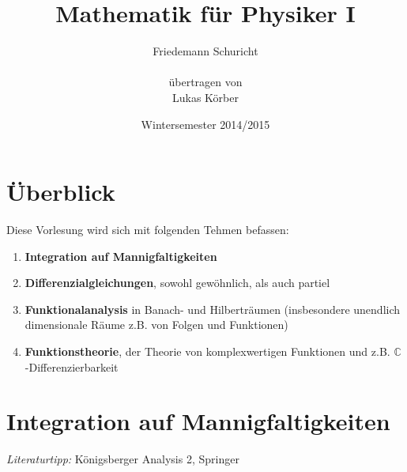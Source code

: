 \documentclass[a4paper,12pt,portrait]{book}
\title{Mathematik f\"ur Physiker I}
\author{Friedemann Schuricht\\ \\ \"ubertragen von\\Lukas K\"orber}
\date{Wintersemester 2014/2015}
\theoremstyle{theoremstyle}
\begin{document}
\maketitle
\tableofcontents
\pagestyle{fancy}
\renewcommand{\thechapter}{\Roman{chapter}} 
\renewcommand*\thesection{\arabic{section}}
\renewcommand\theequation{\maybe{\arabic{chapter}}\arabic{section}.\arabic{equation}}
\DeclareRobustCommand\maybe[1]{\ifnum#1=\value{chapter}\relax\else\uppercase\expandafter{\romannumeral#1}.\fi}
\setcounter{chapter}{7}

\chapter*{Überblick}
Diese Vorlesung wird sich mit folgenden Tehmen befassen:
    \begin{enumerate}
    \item \textbf{Integration auf Mannigfaltigkeiten}
    \item \textbf{Differenzialgleichungen}, sowohl gewöhnlich, als auch partiel
    \item \textbf{Funktionalanalysis} in Banach- und Hilberträumen (insbesondere
    unendlich dimensionale Räume z.B. von Folgen und Funktionen)
    \item \textbf{Funktionstheorie}, der Theorie von komplexwertigen Funktionen
    und z.B. $\mathbb{C}$-Differenzierbarkeit
    \end{enumerate}

\chapter{Integration auf Mannigfaltigkeiten}
\emph{Literaturtipp:} Königsberger Analysis 2, Springer
\setcounter{section}{28}
\end{document}

